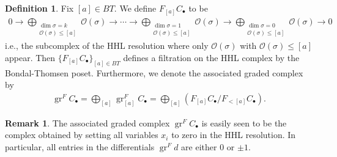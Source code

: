 \documentclass[11pt,reqno]{amsart}
\def\gr {{\operatorname{gr}}}
\theoremstyle{definition}
\newtheorem{definition}[theorem]{Definition}
\newtheorem{remark}[theorem]{Remark}
\numberwithin{equation}{section}
\begin{document}
\begin{definition}
    Fix $[a]\in BT$. We define $F_{[a]}C_{\bullet}$ to be
    \begin{align*}
        0\rightarrow\bigoplus_{\substack{\dim\sigma=k \\ \mathcal{O}(\sigma)\leq [a] }} \mathcal{O}(\sigma) \rightarrow \cdots \rightarrow \bigoplus_{\substack{\dim\sigma=1 \\ \mathcal{O}(\sigma)\leq [a]}} \mathcal{O}(\sigma) \rightarrow \bigoplus_{\substack{\dim\sigma=0 \\ \mathcal{O}(\sigma)\leq [a]}} \mathcal{O}(\sigma)\rightarrow0
    \end{align*}
    i.e., the subcomplex of the HHL resolution where only $\mathcal{O}(\sigma)$ with $\mathcal{O}(\sigma)\leq [a]$ appear. Then $\{F_{[a]}C_{\bullet}\}_{[a]\in BT}$ defines a filtration on the HHL complex by the Bondal-Thomsen poset. Furthermore, we denote the associated graded complex by 
    \begin{align*}
        \gr^F C_{\bullet} = \bigoplus_{[a]} \gr^F_{[a]}C_{\bullet} = \bigoplus_{[a]}\left(F_{[a]}C_{\bullet}/F_{<[a]}C_{\bullet}\right).
    \end{align*}
\end{definition}
\begin{remark}
    The associated graded complex $\gr^F C_{\bullet}$ is easily seen to be the complex obtained by setting all variables $x_i$ to zero in the HHL resolution. In particular, all entries in the differentials $\gr^F d$ are either $0$ or $\pm1$.
\end{remark}
\end{document}
